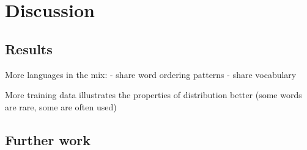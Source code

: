 \chapter{Discussion}
\label{chapter:discussion}


\section{Results}
\label{section:results}

More languages in the mix:
 - share word ordering patterns
 - share vocabulary

More training data illustrates the properties of distribution better (some words are rare, some are often used)



\section{Further work}
\label{section:further_work}

